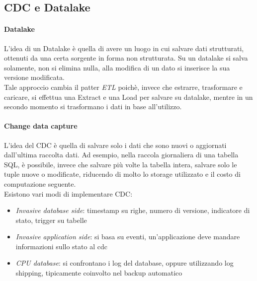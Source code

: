 \subsection{CDC e Datalake}

\paragraph{Datalake}
L'idea di un Datalake è quella di avere un luogo in cui salvare dati strutturati, 
ottenuti da una certa sorgente in forma non strutturata. Su un datalake si salva 
solamente, non si elimina nulla, alla modifica di un dato si inserisce la sua versione 
modificata.\\
Tale approccio cambia il patter \emph{ETL} poichè, invece che estrarre, trasformare e caricare, 
si effettua una Extract e una 
Load per salvare su datalake, mentre in un secondo momento si trasformano i dati in base 
all'utilizzo.

\paragraph{Change data capture}
L'idea del CDC è quella di salvare solo i dati che sono nuovi o aggiornati dall'ultima
raccolta dati. Ad esempio, nella raccola giornaliera di una tabella SQL, è possibile, 
invece che salvare più volte la tabella intera, salvare solo le tuple nuove o 
modificate, riducendo di molto lo storage utilizzato e il costo di computazione 
seguente.\\
Esistono vari modi di implementare CDC:
\begin{itemize}
    \item \emph{Invasive database side}: timestamp su righe, numero di versione, 
    indicatore di stato, trigger su tabelle
    \item \emph{Invasive application side}: si basa su eventi, un'applicazione deve mandare 
    informazioni sullo stato al cdc 
    \item \emph{CPU database}: si confrontano i log del database, oppure utilizzando log shipping, 
    tipicamente coinvolto nel backup automatico
\end{itemize}

